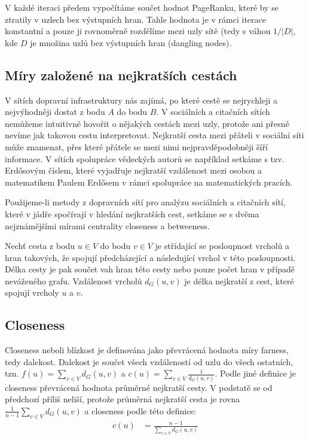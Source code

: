 \documentclass[12pt,titlepage]{report}
\begin{document}
V každé iteraci předem vypočítáme součet hodnot PageRanku, které by se ztratily
v uzlech bez výstupních hran. Tahle hodnota je v rámci iterace konstantní a
pouze ji rovnoměrně rozdělíme mezi uzly sítě (tedy s váhou $1/|D|$, kde $D$ je
množina uzlů bez výstupních hran (dangling nodes).

\subsection{Míry založené na nejkratších cestách}
V sítích dopravní infrastruktury nás zajímá, po které cestě se nejrychleji a
nejvýhodněji dostat z bodu $A$ do bodu $B$. V sociálních a citačních sítích
nemůžeme intuitivně hovořit o nějakých cestách mezi uzly, protože ani přesně
nevíme jak takovou cestu interpretovat. Nejkratší cesta mezi přáteli v sociální
síti může znamenat, přes které přátele se mezi nimi nejpravděpodobněji šíří
informace. V sítích spolupráce vědeckých autorů se například setkáme s tzv.
Erdősovým číslem, které vyjadřuje nejkratší vzdálenost mezi osobou a
matematikem Paulem Erdősem v rámci spolupráce na matematických pracích.

Použijeme-li metody z dopravních sítí pro analýzu sociálních a citačních sítí,
které v jádře spočívají v hledání nejkratších cest, setkáme se s dvěma
nejznámějšími mírami centrality closeness a betweeness.

Nechť cesta z bodu $u \in V$ do bodu $v \in V$ je střídající se posloupnost
vrcholů a hran takových, že spojují předcházející a následující vrchol v této
posloupnosti. Délka cesty je pak součet vah hran této cesty nebo pouze počet
hran v případě neváženého grafu. Vzdálenost vrcholů $d_G(u, v)$ je délka
nejkratší z cest, které spojují vrcholy $u$ a $v$.

\subsection{Closeness}
Closeness neboli blízkost je definována jako převrácená hodnota míry farness,
tedy dalekost. Dalekost je součet všech vzdáleností od uzlu do všech ostatních,
tzn. $f(u) = \sum_{v \in V} d_G(u, v)$ a $c(u) = \sum_{v \in V} \frac{1}{d_G(u,
v)}$. Podle jiné definice je closeness převrácená hodnota průměrné nejkratší
cesty. V podstatě se od předchozí příliš neliší, protože průměrná nejkratší
cesta je rovna $\frac{1}{n
- 1} \sum_{v \in V} d_G(u, v)$ a closeness podle této definice:
\begin{align*}
c(u) &= \frac{n - 1}{\sum_{v \in V} d_G(u, v)}
\end{align*}
\end{document}

